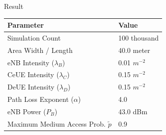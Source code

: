 \documentclass{beamer}
\begin{document}
\begin{frame}{Result}
    \begin{center}
        \begin{tabular}{ | l | l | }
            \hline
                Parameter                                   &       Value               \\ \hline
                Simulation Count                            &       100 thousand        \\ \hline
                Area Width / Length                         &       40.0 meter          \\ \hline
                eNB Intensity ($\lambda_{B}$)               &       0.01 $m^{-2}$       \\ \hline
                CeUE Intensity ($\lambda_{C}$)              &       0.15 $m^{-2}$       \\ \hline
                DeUE Intensity ($\lambda_{D}$)              &       0.15 $m^{-2}$       \\ \hline
                Path Loss Exponent ($\alpha$)               &       4.0                 \\ \hline
                eNB Power ($P_{B}$)                         &       43.0 dBm            \\ \hline
                Maximum Medium Access Prob. $\tilde{p}$     &       0.9                 \\
            \hline
        \end{tabular}
    \end{center}
\end{frame}
\end{document}
